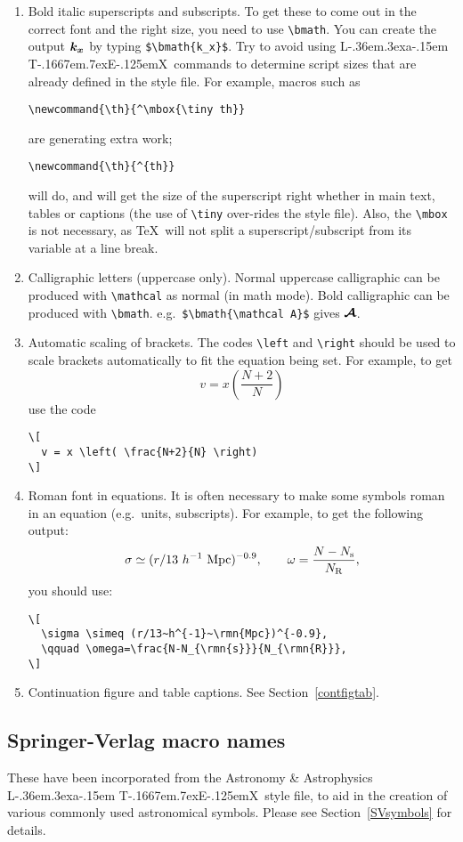 \documentclass[useAMS,usenatbib]{mn2e}
\def\LaTeX{L\kern-.36em\raise.3ex\hbox{a}\kern-.15em
    T\kern-.1667em\lower.7ex\hbox{E}\kern-.125emX}
\begin{document}
\begin{enumerate}
\item Bold italic superscripts and subscripts. To get  these
to  come  out  in the correct font and the right  size,
you need to use \verb"\bmath". You can create the output
$\bmath{k_x}$ by typing \verb"$\bmath{k_x}$".
Try to avoid using \LaTeX\ commands to determine script sizes
that are already  defined in the style file. For example, macros such as
%
\begin{verbatim}
\newcommand{\th}{^\mbox{\tiny th}}
\end{verbatim}
%
are generating extra work;
%
\begin{verbatim}
\newcommand{\th}{^{th}}
\end{verbatim}
%
will do, and  will get  the  size  of the superscript right whether
in  main  text, tables or captions (the use of \verb"\tiny" over-rides
the style  file).
Also, the \verb"\mbox" is not necessary, as \TeX\ will not split a
superscript/subscript from its variable at a line break.

\item Calligraphic letters (uppercase only).
%
Normal uppercase calligraphic can be produced with \verb"\mathcal" as
normal (in math mode). Bold calligraphic can be produced with
\verb"\bmath". e.g.\ \verb"$\bmath{\mathcal A}$" gives $\bmath{\mathcal
A}$.
%

\item Automatic scaling of brackets. The codes \verb"\left" and
\verb"\right" should  be used to scale brackets automatically to
fit the equation being set. For example, to get
\[
  v = x \left( \frac{N+2}{N} \right)
\]
use the code
%
\begin{verbatim}
\[
  v = x \left( \frac{N+2}{N} \right)
\]
\end{verbatim}

\item Roman font in equations. It is often necessary to make some
symbols roman in an equation (e.g.\ units, subscripts). For  example,
to get the following output:
\[
  \sigma \simeq (r/13~h^{-1}~{\mathrm{Mpc}})^{-0.9},
  \qquad \omega = \frac{N-N_{{\mathrm{s}}}}{N_{{\mathrm{R}}}},
\]
you should use:
%
\begin{verbatim}
\[
  \sigma \simeq (r/13~h^{-1}~\rmn{Mpc})^{-0.9},
  \qquad \omega=\frac{N-N_{\rmn{s}}}{N_{\rmn{R}}},
\]
\end{verbatim}

\item Continuation figure and table captions.
See Section~\ref{contfigtab}.
\end{enumerate}


\subsection{Springer-Verlag macro names}

These have been incorporated from the Astronomy \& Astrophysics \LaTeX\
style file, to aid in the creation of various commonly used
astronomical symbols. Please see Section~\ref{SVsymbols} for details.



\label{lastpage}
\end{document}
